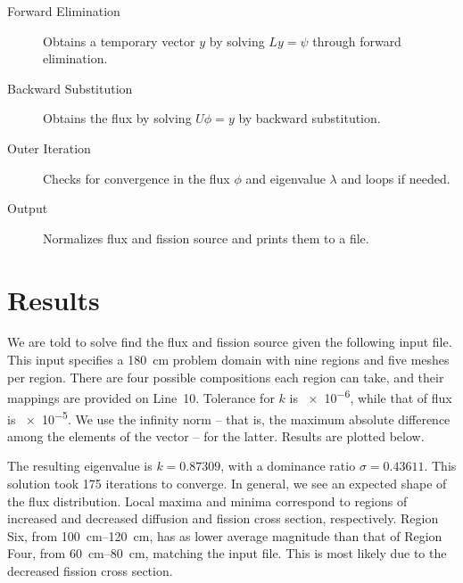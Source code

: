 \documentclass[fleqn,11pt]{article}
\begin{document}
\begin{description}
  \item [Forward Elimination] Obtains a temporary vector \(y\) by solving \(L y = \psi\) through forward elimination.
  
  \item [Backward Substitution] Obtains the flux by solving \(U \phi = y\) by backward substitution.
  
  \item [Outer Iteration] Checks for convergence in the flux \(\phi\) and eigenvalue \(\lambda\) and loops if needed.
  
  \item [Output] Normalizes flux and fission source and prints them to a file.
\end{description}

\section{Results}
We are told to solve find the flux and fission source given 
the following input file. This input specifies a \SI{180}{\centi\meter}
problem domain with nine regions and five meshes per region.
There are four possible compositions each region can take,
and their mappings are provided on Line~10. Tolerance for 
\(k\) is \num{e-6}, while that of flux is \num{e-5}. We use 
the infinity norm -- that is, the maximum absolute difference 
among the elements of the vector -- for the latter. Results 
are plotted below.



The resulting eigenvalue is \(k = 0.87309\), with a dominance
ratio \(\sigma = 0.43611\). This solution took 175 iterations
to converge. In general, we see an expected shape of the 
flux distribution. Local maxima and minima correspond to 
regions of increased and decreased diffusion and fission 
cross section, respectively. Region Six, from 
\SIrange{100}{120}{\centi\meter}, has as lower average 
magnitude than that of Region Four, from 
\SIrange{60}{80}{\centi\meter}, matching the input file. 
This is most likely due to the decreased fission cross 
section.

\begin{center}
\end{center}
\end{document}
